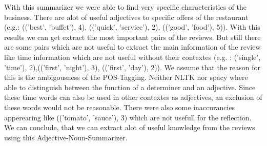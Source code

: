 	
	With this summarizer we were able to find very specific characteristics of the business. There are alot of useful adjectives to specific offers of the restaurant (e.g.: (('best', 'buffet'), 4), (('quick', 'service'), 2), (('good', 'food'), 5)). With this results we can get extract the most important pairs of the reviews. But still there are some pairs which are not useful to extract the main information of the review like time information which are not useful without their contextes (e.g. : ('single', 'time'), 2),(('first', 'night'), 3), (('first', 'day'), 2)). We assume that the reason for this is the ambigousness of 
	the POS-Tagging. Neither NLTK nor spacy where able to distinguish between the function of a determiner and an adjective. Since these time words can also be used in other contextes as adjectives, an exclusion of these words would not be reasonable. There were also some inaccurancies apperearing like  (('tomato', 'sauce'), 3) which are not usefull for the reflection.
	We can conclude, that we can extract alot of useful knowledge from the reviews using this Adjective-Noun-Summarizer. 
	